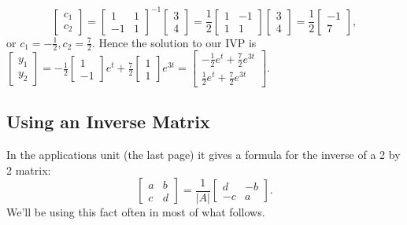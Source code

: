 \begin{example}
$$
\begin{bmatrix}c_1\\c_2\end{bmatrix} 
=
\begin{bmatrix}1 &1\\-1&1\end{bmatrix}^{-1}
\begin{bmatrix}3\\4\end{bmatrix} 
=
\frac{1}{2}
\begin{bmatrix}1 &-1\\1&1\end{bmatrix}
\begin{bmatrix}3\\4\end{bmatrix} 
=
\frac{1}{2}
\begin{bmatrix}-1 \\7\end{bmatrix}
,$$ or $c_1=-\frac12, c_2=\frac72$.  Hence the solution to our IVP is 
$ \begin{bmatrix}y_1\\y_2\end{bmatrix} 
= -\frac12\begin{bmatrix}1\\-1\end{bmatrix}e^t 
+ \frac72\begin{bmatrix}1\\1\end{bmatrix}e^{3t}
=
\begin{bmatrix}-\frac12e^t + \frac72e^{3t}\\\frac12e^t + \frac72e^{3t}\end{bmatrix}$.
\end{example}

\subsection{Using an Inverse Matrix}
In the applications unit (the last page) it gives a formula for the inverse of a 2 by 2 matrix:  
$$\begin{bmatrix}a&b\\ c&d\end{bmatrix} = \frac{1}{|A|}\begin{bmatrix}d&-b\\-c&a\end{bmatrix}. $$ We'll be using this fact often in most of what follows.

